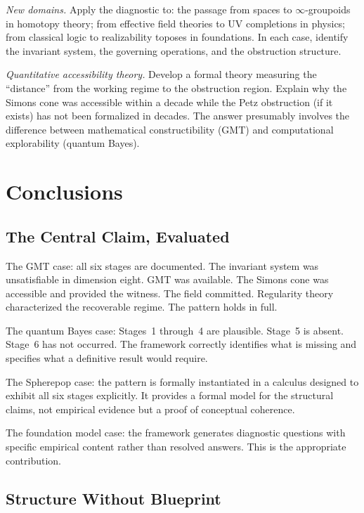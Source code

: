\documentclass[12pt,oneside]{book}
\theoremstyle{plain}
\theoremstyle{definition}
\theoremstyle{remark}
\begin{document}
\emph{New domains.} Apply the diagnostic to: the passage from spaces to
$\infty$-groupoids in homotopy theory; from effective field theories to UV
completions in physics; from classical logic to realizability toposes in
foundations. In each case, identify the invariant system, the governing
operations, and the obstruction structure.

\emph{Quantitative accessibility theory.} Develop a formal theory measuring
the ``distance'' from the working regime to the obstruction region. Explain
why the Simons cone was accessible within a decade while the Petz obstruction
(if it exists) has not been formalized in decades. The answer presumably
involves the difference between mathematical constructibility (GMT) and
computational explorability (quantum Bayes).

\chapter{Conclusions}

\section{The Central Claim, Evaluated}

The GMT case: all six stages are documented. The invariant system was
unsatisfiable in dimension eight. GMT was available. The Simons cone was
accessible and provided the witness. The field committed. Regularity theory
characterized the recoverable regime. The pattern holds in full.

The quantum Bayes case: Stages~1 through~4 are plausible. Stage~5 is absent.
Stage~6 has not occurred. The framework correctly identifies what is missing
and specifies what a definitive result would require.

The Spherepop case: the pattern is formally instantiated in a calculus
designed to exhibit all six stages explicitly. It provides a formal model
for the structural claims, not empirical evidence but a proof of conceptual
coherence.

The foundation model case: the framework generates diagnostic questions
with specific empirical content rather than resolved answers. This is the
appropriate contribution.

\section{Structure Without Blueprint}
\end{document}
